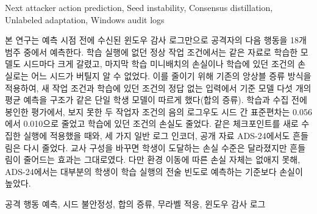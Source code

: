 \begin{Engkeyword}
Next attacker action prediction, Seed instability,
Consensus distillation, Unlabeled adaptation, Windows audit logs
\end{Engkeyword}

\begin{korabstract}
본 연구는 예측 시점 전에 수신된 윈도우 감사 로그만으로 공격자의 다음
행동을 18개 범주 중에서 예측한다. 학습 실행에 없던 정상 작업 조건에서는 같은
자료로 학습한 모델도 시드마다 크게 갈렸고, 마지막 학습 미니배치의 손실이나 학습에 있던 조건의
손실로는 어느 시드가 버틸지 알 수 없었다. 이를 줄이기 위해 기존의 앙상블 증류
방식을 적용하여, 새 작업 조건과 학습에 있던 조건의 정답 없는 입력에서 기준 모델
다섯 개의 평균 예측을 구조가 같은 단일 학생 모델이 따르게 했다(합의 증류).
학습과 수집 전에 봉인한 평가에서, 보지 못한 두 작업자 조건의 음의 로그우도 시드 간
표준편차는 0.056에서 0.010으로 줄었고 학습에 있던 조건의 손실도 줄었다. 같은
체크포인트를 새로 수집한 실행에 적용했을 때와, 세 가지 일반 로그 인코더, 공개 자료
ADS-24에서도 흔들림은 다시 줄었다. 교사 구성을 바꾸면 학생이 도달하는 손실 수준은
달라졌지만 흔들림이 줄어드는 효과는 그대로였다. 다만 환경
이동에 따른 손실 자체는 없애지 못해, ADS-24에서는 대부분의 학생이 학습 실행의 전술
빈도로 예측하는 기준보다 손실이 높았다.
\end{korabstract}

\begin{Korkeyword}
공격 행동 예측, 시드 불안정성, 합의 증류, 무라벨 적응, 윈도우 감사 로그
\end{Korkeyword}
